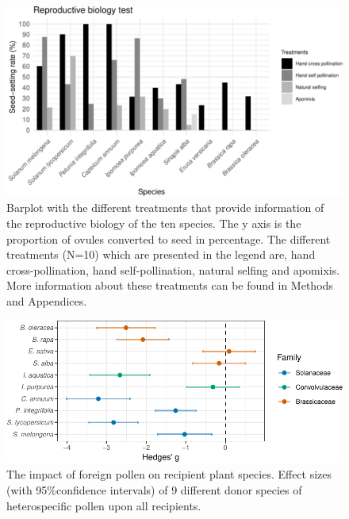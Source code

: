 \documentclass[11pt,a4paper]{article}
\begin{document}
\newpage

\begin{figure}

{\centering \includegraphics{output/figures/unnamed-chunk-3-1} 

}

\caption{Barplot with the different treatments that provide information of the reproductive biology of the ten species. The y axis is the proportion of ovules converted to seed in percentage. The different treatments (N=10) which are presented in the legend are, hand cross-pollination, hand self-pollination, natural selfing and apomixis. More information about these treatments can be found in Methods and Appendices.}\label{fig:unnamed-chunk-3}
\end{figure}

\newpage

\begin{figure}
\centering
\includegraphics{output/figures/unnamed-chunk-4-1.pdf}
\caption{The impact of foreign pollen on recipient plant species. Effect
sizes (with 95\%confidence intervals) of 9 different donor species of
heterospecific pollen upon all recipients.}
\end{figure}

\newpage
\end{document}
